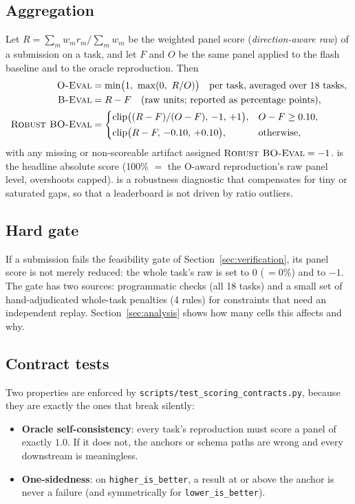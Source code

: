 \subsection{Aggregation}
Let $R=\sum_m w_m r_m / \sum_m w_m$ be the weighted panel score (\emph{direction-aware raw}) of a submission on a task, and let $F$ and $O$ be the same panel applied to the flash baseline and to the oracle reproduction. Then
\begin{align}
\textsc{O-Eval} &= \min\bigl(1,\ \max(0,\ R / O)\bigr) \quad\text{per task, averaged over 18 tasks},\\
\textsc{B-Eval} &= R - F \quad\text{(raw units; reported as percentage points)},\\
\textsc{Robust BO-Eval} &= \begin{cases}
\mathrm{clip}\bigl((R-F)/(O-F),\,-1,\,+1\bigr), & O-F \ge 0.10,\\[2pt]
\mathrm{clip}\bigl(R-F,\,-0.10,\,+0.10\bigr), & \text{otherwise},
\end{cases}
\end{align}
with any missing or non-scoreable artifact assigned $\textsc{Robust BO-Eval}=-1$. \oeval{} is the headline absolute score (100\% $=$ the O-award reproduction's raw panel level, overshoots capped). \roeval{} is a robustness diagnostic that compensates for tiny or saturated gaps, so that a leaderboard is not driven by ratio outliers.

\subsection{Hard gate}
\label{sec:hard-gate}
If a submission fails the feasibility gate of Section~\ref{sec:verification}, its panel score is not merely reduced: the whole task's raw is set to $0$ (\oeval{}$\,=0\%$) and \roeval{} to $-1$. The gate has two sources: programmatic checks (all 18 tasks) and a small set of hand-adjudicated whole-task penalties (4 rules) for constraints that need an independent replay. Section~\ref{sec:analysis} shows how many cells this affects and why.

\subsection{Contract tests}
Two properties are enforced by \texttt{scripts/test\_scoring\_contracts.py}, because they are exactly the ones that break silently:
\begin{itemize}[leftmargin=1.4em,itemsep=1pt]
\item \textbf{Oracle self-consistency}: every task's reproduction must score a panel of exactly $1.0$. If it does not, the anchors or schema paths are wrong and every downstream \oeval{} is meaningless.
\item \textbf{One-sidedness}: on \texttt{higher\_is\_better}, a result at or above the anchor is never a failure (and symmetrically for \texttt{lower\_is\_better}).
\end{itemize}
